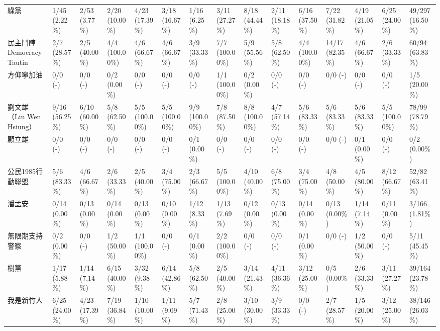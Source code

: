 \documentclass[a4paper, 10pt, conference]{ieeeconf}       %
\begin{document}
\begin{CJK}{UTF8}{bsmi}
\begin{landscape}
\begin{longtable}[c]{@{}L{2.45cm}L{1.1cm}L{1.1cm}L{1.1cm}L{1.1cm}L{1.1cm}L{1.1cm}L{1.1cm}L{1.1cm}L{1.1cm}L{1.1cm}L{1.1cm}L{1.1cm}L{1.1cm}L{1.1cm}@{}}
綠黨 & 1/45 (2.22\%) & 2/53 (3.77\%) & 2/20 (10.00\%) & 4/23 (17.39\%) & 3/18 (16.67\%) & 1/16 (6.25\%) & 3/11 (27.27\%) & 8/18 (44.44\%) & 2/11 (18.18\%) & 6/16 (37.50\%) & 7/22 (31.82\%) & 4/19 (21.05\%) & 6/25 (24.00\%) & 49/297 (16.50\%) \\
民主鬥陣 Democracy Tautin & 2/7 (28.57\%) & 2/5 (40.00\%) & 4/4 (100.00\%) & 4/6 (66.67\%) & 4/6 (66.67\%) & 3/9 (33.33\%) & 7/7 (100.00\%) & 5/9 (55.56\%) & 5/8 (62.50\%) & 4/4 (100.00\%) & 14/17 (82.35\%) & 4/6 (66.67\%) & 2/6 (33.33\%) & 60/94 (63.83\%) \\
方仰寧加油 & 0/0 (-) & 0/0 (-) & 0/2 (0.00\%) & 0/0 (-) & 0/0 (-) & 0/0 (-) & 1/1 (100.00\%) & 0/2 (0.00\%) & 0/0 (-) & 0/0 (-) & 0/0 (-) & 0/0 (-) & 0/0 (-) & 1/5 (20.00\%) \\
劉文雄（Liu Wen Hsiung） & 9/16 (56.25\%) & 6/10 (60.00\%) & 5/8 (62.50\%) & 5/5 (100.00\%) & 5/5 (100.00\%) & 9/9 (100.00\%) & 7/8 (87.50\%) & 8/8 (100.00\%) & 4/7 (57.14\%) & 5/6 (83.33\%) & 5/6 (83.33\%) & 5/6 (83.33\%) & 5/5 (100.00\%) & 78/99 (78.79\%) \\
顧立雄 & 0/0 (-) & 0/0 (-) & 0/0 (-) & 0/0 (-) & 0/0 (-) & 0/1 (0.00\%) & 0/0 (-) & 0/0 (-) & 0/0 (-) & 0/0 (-) & 0/0 (-) & 0/1 (0.00\%) & 0/0 (-) & 0/2 (0.00\%) \\
公民1985行動聯盟 & 5/6 (83.33\%) & 4/6 (66.67\%) & 2/6 (33.33\%) & 2/5 (40.00\%) & 3/4 (75.00\%) & 2/3 (66.67\%) & 5/5 (100.00\%) & 4/10 (40.00\%) & 6/8 (75.00\%) & 3/4 (75.00\%) & 4/8 (50.00\%) & 4/5 (80.00\%) & 8/12 (66.67\%) & 52/82 (63.41\%) \\
潘孟安 & 0/14 (0.00\%) & 0/13 (0.00\%) & 0/14 (0.00\%) & 0/13 (0.00\%) & 0/10 (0.00\%) & 1/12 (8.33\%) & 1/13 (7.69\%) & 0/12 (0.00\%) & 0/13 (0.00\%) & 0/14 (0.00\%) & 0/13 (0.00\%) & 1/14 (7.14\%) & 0/11 (0.00\%) & 3/166 (1.81\%) \\
無限期支持警察 & 0/2 (0.00\%) & 0/0 (-) & 1/2 (50.00\%) & 1/1 (100.00\%) & 0/0 (-) & 0/1 (0.00\%) & 2/2 (100.00\%) & 0/0 (-) & 0/0 (-) & 0/1 (0.00\%) & 0/0 (-) & 1/2 (50.00\%) & 0/0 (-) & 5/11 (45.45\%) \\
樹黨 & 1/17 (5.88\%) & 1/14 (7.14\%) & 6/15 (40.00\%) & 3/32 (9.38\%) & 6/14 (42.86\%) & 5/8 (62.50\%) & 2/5 (40.00\%) & 3/14 (21.43\%) & 4/11 (36.36\%) & 3/12 (25.00\%) & 0/5 (0.00\%) & 2/6 (33.33\%) & 3/11 (27.27\%) & 39/164 (23.78\%) \\
我是新竹人 & 6/25 (24.00\%) & 4/23 (17.39\%) & 7/19 (36.84\%) & 1/10 (10.00\%) & 1/11 (9.09\%) & 5/7 (71.43\%) & 2/8 (25.00\%) & 3/10 (30.00\%) & 3/9 (33.33\%) & 0/0 (-) & 2/7 (28.57\%) & 1/5 (20.00\%) & 3/12 (25.00\%) & 38/146 (26.03\%) \\

\end{longtable}
\end{landscape}
\end{CJK}
\end{document}
